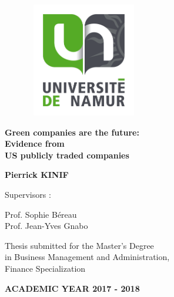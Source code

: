 \documentclass[12pt,]{article}
\title{}
\author{}
\date{}
\begin{document}


\begin{centering}

\begin{figure}[!h]
\centering
\includegraphics[width=5cm, height=5cm]{figures/UNamur.png}
\end{figure}

\vspace{3.5cm}

\Large
{\bf Green companies are the future:\\ Evidence from \\US publicly traded companies}

\vspace{1.5cm}

\normalsize
{\bf Pierrick KINIF}

\vspace{1cm}
\normalsize
Supervisors :\\
\vspace{0.5cm}

Prof. Sophie Béreau\\
Prof. Jean-Yves Gnabo
\vspace{1cm}

\normalsize
Thesis submitted for the Master's Degree \\
in Business Management and Administration, \\
Finance Specialization

\vspace{1cm}
\normalsize
{\bf ACADEMIC YEAR 2017 - 2018\\}
\end{centering}

 \thispagestyle{firstpage} \renewcommand{\footrulewidth}{0pt}
\renewcommand{\headrulewidth}{0pt}
\end{document}

